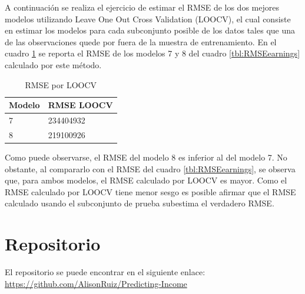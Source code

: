 \documentclass[11pt,a4paper]{article}
\begin{document}
A continuación se realiza el ejercicio de estimar el RMSE de los dos mejores modelos utilizando Leave One Out Cross Validation (LOOCV), el cual consiste en estimar los modelos para cada subconjunto posible de los datos tales que una de las observaciones quede por fuera de la muestra de entrenamiento. En el cuadro \ref{tbl:RMSELOOCV} se reporta el RMSE de los modelos 7 y 8 del cuadro \ref{tbl:RMSEearnings} calculado por este método.


\begin{table}[H]
\centering
\caption{RMSE por LOOCV}
\label{tab:rmse_loocv}
\begin{tabular}{@{}ll@{}}
\toprule
Modelo & RMSE LOOCV \\ \midrule
7 & 234404932 \\ 
8 & 219100926 \\ \bottomrule
\end{tabular}
\label{tbl:RMSELOOCV}
\end{table}

Como puede observarse, el RMSE del modelo 8 es inferior al del modelo 7. No obstante, al compararlo con el RMSE del cuadro \ref{tbl:RMSEearnings}, se observa que, para ambos modelos, el RMSE calculado por LOOCV es mayor. Como el RMSE calculado por LOOCV tiene menor sesgo es posible afirmar que el RMSE calculado usando el subconjunto de prueba subestima el verdadero RMSE. 


\section{Repositorio}

El repositorio se puede encontrar en el siguiente enlace:\\ \url{https://github.com/AlisonRuiz/Predicting-Income} 




\end{document}
